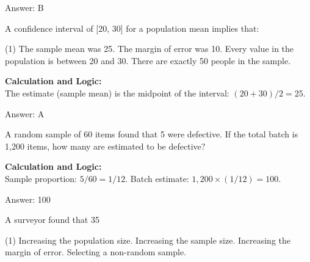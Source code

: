 \documentclass[11pt,paper=a4,answers]{exam}
\begin{document}
\begin{questions}
\begin{solution}
\vspace{30pt}

Answer: \colorbox{yellow!100}{B}
\end{solution}

\vspace{60pt}

\question
A confidence interval of [20, 30] for a population mean implies that:
\begin{tasks}(1)
    \task The sample mean was 25.
    \task The margin of error was 10.
    \task Every value in the population is between 20 and 30.
    \task There are exactly 50 people in the sample.
\end{tasks}

\begin{solution}
\textbf{Calculation and Logic:} \\
The estimate (sample mean) is the midpoint of the interval: $(20 + 30) / 2 = 25$. 

\vspace{30pt}

Answer: \colorbox{yellow!100}{A}
\end{solution}

\vspace{60pt}

\question
A random sample of 60 items found that 5 were defective. If the total batch is 1,200 items, how many are estimated to be defective?

\begin{solution}
\textbf{Calculation and Logic:} \\
Sample proportion: $5 / 60 = 1 / 12$. Batch estimate: $1,200 \times (1 / 12) = 100$.

\vspace{30pt}

Answer: \colorbox{yellow!100}{100}
\end{solution}

\vspace{60pt}

\question
A surveyor found that 35%
\begin{tasks}(1)
    \task Increasing the population size.
    \task Increasing the sample size.
    \task Increasing the margin of error.
    \task Selecting a non-random sample.
\end{tasks}


\end{questions}
\end{document}
